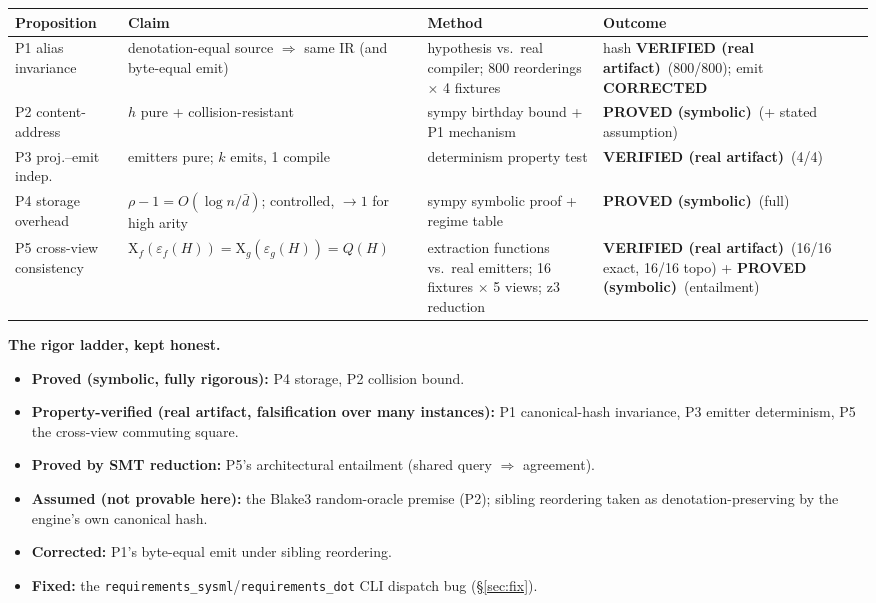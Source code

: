 \documentclass[11pt]{article}
\theoremstyle{definition}
\newcommand{\proved}{\textcolor{green!55!black}{\textbf{PROVED (symbolic)}}}
\newcommand{\verified}{\textcolor{green!55!black}{\textbf{VERIFIED (real artifact)}}}
\newcommand{\corrected}{\textcolor{orange!85!black}{\textbf{CORRECTED}}}
\newcommand{\X}{\mathrm{X}}
\begin{document}
\begin{table}[h]
\centering\small
\begin{tabular}{p{3.1cm}p{5.4cm}p{3.2cm}l}
\toprule
Proposition & Claim & Method & Outcome \\
\midrule
P1 alias invariance & denotation-equal source $\Rightarrow$ same IR (and byte-equal emit) &
  \textsf{hypothesis} vs.\ real compiler; 800 reorderings $\times$ 4 fixtures & hash \verified\ (800/800);
  emit \corrected \\
P2 content-address & $h$ pure + collision-resistant & \textsf{sympy} birthday bound + P1 mechanism &
  \proved\ (+ stated assumption)\\
P3 proj.--emit indep. & emitters pure; $k$ emits, 1 compile & determinism property test & \verified\ (4/4)\\
P4 storage overhead & $\rho-1 = O(\log n/\bar d)$; controlled, $\to1$ for high arity & \textsf{sympy} symbolic
  proof + regime table & \proved\ (full)\\
P5 cross-view consistency & $\X_f(\varepsilon_f(H)) = \X_g(\varepsilon_g(H)) = Q(H)$ & extraction functions vs.\
  real emitters; 16 fixtures $\times$ 5 views; \textsf{z3} reduction & \verified\ (16/16 exact, 16/16 topo) +
  \proved\ (entailment)\\
\bottomrule
\end{tabular}
\end{table}

\noindent\textbf{The rigor ladder, kept honest.}
\begin{itemize}\itemsep1pt
  \item \textbf{Proved (symbolic, fully rigorous):} P4 storage, P2 collision bound.
  \item \textbf{Property-verified (real artifact, falsification over many instances):} P1 canonical-hash
        invariance, P3 emitter determinism, P5 the cross-view commuting square.
  \item \textbf{Proved by SMT reduction:} P5's architectural entailment (shared query $\Rightarrow$ agreement).
  \item \textbf{Assumed (not provable here):} the Blake3 random-oracle premise (P2); sibling reordering taken as
        denotation-preserving by the engine's own canonical hash.
  \item \textbf{Corrected:} P1's byte-equal emit under sibling reordering.
  \item \textbf{Fixed:} the \texttt{requirements\_sysml}/\texttt{requirements\_dot} CLI dispatch bug (\S\ref{sec:fix}).
\end{itemize}
\end{document}
